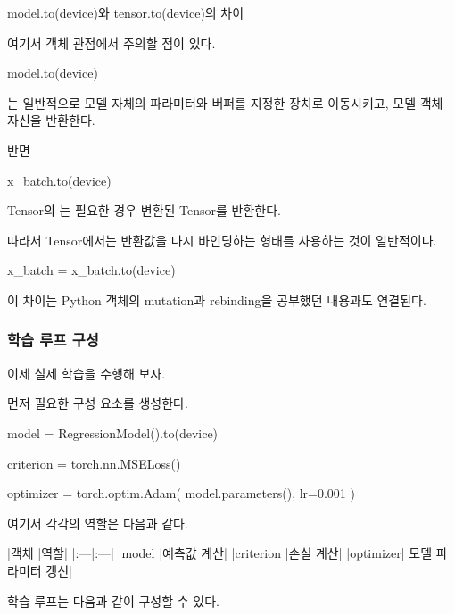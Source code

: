 \begin{dhknote}
\begin{dhksmry}[centered]
model.to(device)와 tensor.to(device)의 차이
\end{dhksmry}
\end{dhknote}

여기서 객체 관점에서 주의할 점이 있다.

\begin{dhkcode}
model.to(device)
\end{dhkcode}

는 일반적으로 모델 자체의 파라미터와 버퍼를 지정한 장치로 이동시키고, 모델 객체 자신을 반환한다.

반면

\begin{dhkcode}
x_batch.to(device)
\end{dhkcode}

Tensor의 는 필요한 경우 변환된 Tensor를 반환한다.

따라서 Tensor에서는 반환값을 다시 바인딩하는 형태를 사용하는 것이 일반적이다.

\begin{dhkcode}
x_batch = x_batch.to(device)
\end{dhkcode}

이 차이는 Python 객체의 mutation과 rebinding을 공부했던 내용과도 연결된다.

\subsubsection{학습 루프 구성}

이제 실제 학습을 수행해 보자.

먼저 필요한 구성 요소를 생성한다.

\begin{dhkcode}
model = RegressionModel().to(device)

criterion = torch.nn.MSELoss()

optimizer = torch.optim.Adam(
    model.parameters(),
    lr=0.001
)
\end{dhkcode}

여기서 각각의 역할은 다음과 같다.

\begin{dhktable}
|객체	|역할|
|:---|:---|
|model	|예측값 계산|
|criterion	|손실 계산|
|optimizer|	모델 파라미터 갱신|
\end{dhktable}

학습 루프는 다음과 같이 구성할 수 있다.

